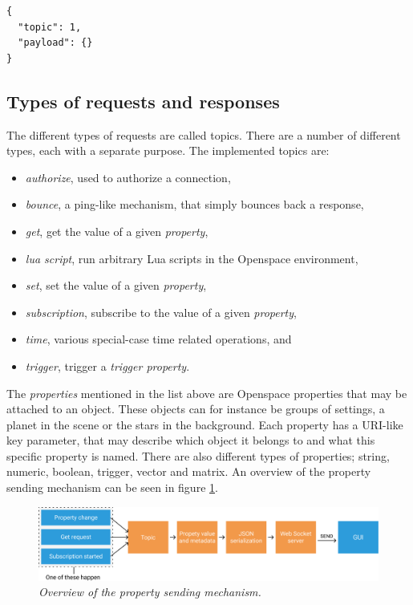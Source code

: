 \begin{lstlisting}[caption={Example request sent by the GUI},label=lst:response]
{
  "topic": 1,
  "payload": {}
}
\end{lstlisting}

\subsection{Types of requests and responses}

The different types of requests are called topics. There are a number of different types, each with a separate purpose. The implemented topics are:

\begin{itemize}
  \item \emph{authorize}, used to authorize a connection,
  \item \emph{bounce}, a ping-like mechanism, that simply bounces back a response,
  \item \emph{get}, get the value of a given \emph{property},
  \item \emph{lua script}, run arbitrary Lua scripts in the Openspace environment,
  \item \emph{set}, set the value of a given \emph{property},
  \item \emph{subscription}, subscribe to the value of a given \emph{property},
  \item \emph{time}, various special-case time related operations, and
  \item \emph{trigger}, trigger a \emph{trigger property}.
\end{itemize}

The \emph{properties} mentioned in the list above are Openspace properties that may be attached to an object. These objects can for instance be groups of settings, a planet in the scene or the stars in the background. Each property has a URI-like key parameter, that may describe which object it belongs to and what this specific property is named. There are also different types of properties; string, numeric, boolean, trigger, vector and matrix. An overview of the property sending mechanism can be seen in figure \ref{fig:propertysending}. 

\begin{figure}[!h]
\centering
\includegraphics[width=0.9\linewidth]{./figures/propertysending.png}
\caption{\emph{Overview of the property sending mechanism.}}\label{fig:propertysending}
\end{figure}

